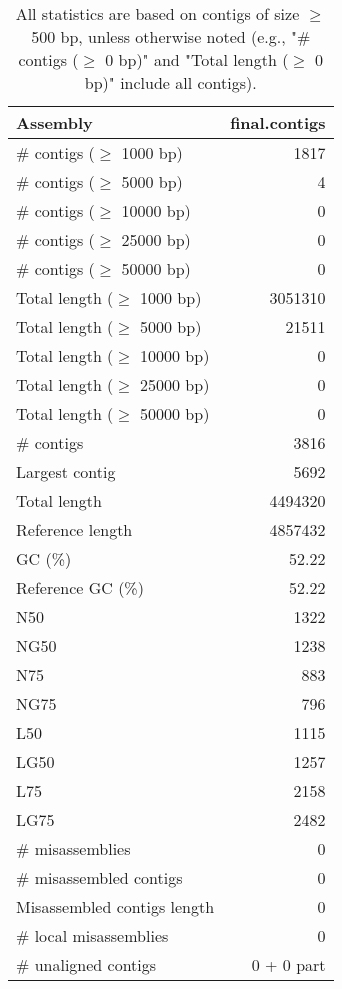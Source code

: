 \documentclass[12pt,a4paper]{article}
\begin{document}
\begin{table}[ht]
\begin{center}
\caption{All statistics are based on contigs of size $\geq$ 500 bp, unless otherwise noted (e.g., "\# contigs ($\geq$ 0 bp)" and "Total length ($\geq$ 0 bp)" include all contigs).}
\begin{tabular}{|l*{1}{|r}|}
\hline
Assembly & final.contigs \\ \hline
\# contigs ($\geq$ 1000 bp) & 1817 \\ \hline
\# contigs ($\geq$ 5000 bp) & 4 \\ \hline
\# contigs ($\geq$ 10000 bp) & 0 \\ \hline
\# contigs ($\geq$ 25000 bp) & 0 \\ \hline
\# contigs ($\geq$ 50000 bp) & 0 \\ \hline
Total length ($\geq$ 1000 bp) & 3051310 \\ \hline
Total length ($\geq$ 5000 bp) & 21511 \\ \hline
Total length ($\geq$ 10000 bp) & 0 \\ \hline
Total length ($\geq$ 25000 bp) & 0 \\ \hline
Total length ($\geq$ 50000 bp) & 0 \\ \hline
\# contigs & 3816 \\ \hline
Largest contig & 5692 \\ \hline
Total length & 4494320 \\ \hline
Reference length & 4857432 \\ \hline
GC (\%) & 52.22 \\ \hline
Reference GC (\%) & 52.22 \\ \hline
N50 & 1322 \\ \hline
NG50 & 1238 \\ \hline
N75 & 883 \\ \hline
NG75 & 796 \\ \hline
L50 & 1115 \\ \hline
LG50 & 1257 \\ \hline
L75 & 2158 \\ \hline
LG75 & 2482 \\ \hline
\# misassemblies & 0 \\ \hline
\# misassembled contigs & 0 \\ \hline
Misassembled contigs length & 0 \\ \hline
\# local misassemblies & 0 \\ \hline
\# unaligned contigs & 0 + 0 part \\ \hline

\end{tabular}
\end{center}
\end{table}
\end{document}

